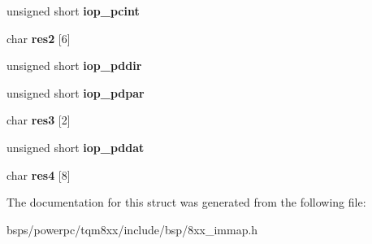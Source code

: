 \begin{DoxyCompactItemize}
unsigned short {\bfseries iop\+\_\+pcint}
\item 
\mbox{\label{structio__port_a14641e8435268135328f0edad6de615b}} 
char {\bfseries res2} \mbox{[}6\mbox{]}
\item 
\mbox{\label{structio__port_ad438637792f0363cac97e37def976afb}} 
unsigned short {\bfseries iop\+\_\+pddir}
\item 
\mbox{\label{structio__port_ac82d9bc614963196dff2307b1446353f}} 
unsigned short {\bfseries iop\+\_\+pdpar}
\item 
\mbox{\label{structio__port_a66df823184be36122efb22e4cebdf0a6}} 
char {\bfseries res3} \mbox{[}2\mbox{]}
\item 
\mbox{\label{structio__port_ae12e40009e17eeb24da4174b160647bd}} 
unsigned short {\bfseries iop\+\_\+pddat}
\item 
\mbox{\label{structio__port_a2f26545b50a87542b83604f23e5db08f}} 
char {\bfseries res4} \mbox{[}8\mbox{]}
\end{DoxyCompactItemize}


The documentation for this struct was generated from the following file\+:\begin{DoxyCompactItemize}
\item 
bsps/powerpc/tqm8xx/include/bsp/8xx\+\_\+immap.\+h\end{DoxyCompactItemize}
